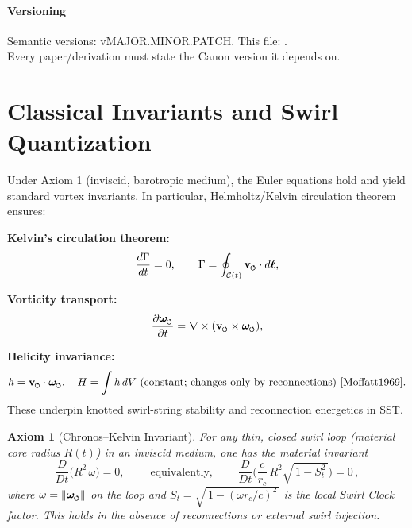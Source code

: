 \documentclass[11pt]{article}
\newcommand{\swirlarrow}{%
     \mathchoice{\mkern-2mu\scriptstyle\boldsymbol{\circlearrowleft}}%
                {\mkern-2mu\scriptstyle\boldsymbol{\circlearrowleft}}%
                {\mkern-2mu\scriptscriptstyle\boldsymbol{\circlearrowleft}}%
                {\mkern-2mu\scriptscriptstyle\boldsymbol{\circlearrowleft}}%
}
\newcommand{\vswirl}{\mathbf{v}_{\swirlarrow}}
\newcommand{\omegas}{\boldsymbol{\omega}_{\swirlarrow}}  %
\newtheorem{axiom}{Axiom}
\begin{document}
\paragraph{Versioning} Semantic versions: vMAJOR.MINOR.PATCH. This file: \canonversion.\\
    Every paper/derivation must state the Canon version it depends on.
    \vfill
    \titlepageClose

\section{Classical Invariants and Swirl Quantization}
\label{sec:classical_invariants}
Under Axiom 1 (inviscid, barotropic medium), the Euler equations hold and yield standard vortex invariants. In particular, Helmholtz/Kelvin circulation theorem ensures:

\textbf{Kelvin's circulation theorem:}
    \begin{equation}
        \frac{d\Gamma}{dt}=0, \qquad \Gamma=\oint_{\mathcal{C}(t)} \vswirl\cdot d\boldsymbol{\ell}, \label{eq:kelvin}
    \end{equation}

\textbf{Vorticity transport:}
    \begin{equation}
        \pdv{\omegas}{t} = \nabla\times(\vswirl\times \omegas), \label{eq:vorticity-transport}
    \end{equation}

\textbf{Helicity invariance:}
    \begin{equation}
        h=\vswirl\cdot \omegas,\quad H=\int h\, dV\ \text{(constant; changes only by reconnections)~\cite{Moffatt1969}}. \label{eq:helicity}
    \end{equation}
These underpin knotted swirl-string stability and reconnection energetics in SST.

\begin{axiom}[Chronos–Kelvin Invariant]
\label{ax:chronos-kelvin}
    For any thin, closed swirl loop (material core radius $R(t)$) in an inviscid medium, one has the material invariant
    \begin{equation}
        \boxed{\;
        \frac{D}{Dt}\!\Big(R^2\,\omega\Big)=0,
            \;} \qquad \text{equivalently,} \qquad
        \boxed{\;
        \frac{D}{Dt}\!\Big(
        \frac{c}{r_c}\,R^2 \sqrt{\,1-S_t^2\,}
        \Big)=0\,,
            \;}
        \label{eq:CK}
    \end{equation}
    where $\omega=\|\omegas\|$ on the loop and $S_t=\sqrt{\,1-(\omega r_c/c)^2\,}$ is the local Swirl Clock factor. This holds in the absence of reconnections or external swirl injection.
\end{axiom}
\end{document}
